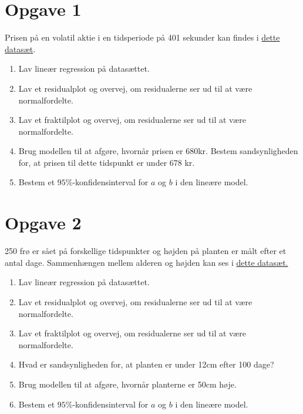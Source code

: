 

\section*{Opgave 1}

Prisen på en volatil aktie i en tidsperiode på 401 sekunder kan findes i \href{https://github.com/ChristianJLex/TeachingNotes/raw/master/2022-2023/Data%20og%20lign/Aktiepris.xlsx}{\color{blue!60} dette datasæt}.
\begin{enumerate}[label=\roman*)]
	\item Lav lineær regression på datasættet.
	\item Lav et residualplot og overvej, om residualerne ser ud til at være normalfordelte.
	\item Lav et fraktilplot og overvej, om residualerne ser ud til at være normalfordelte. 
	\item Brug modellen til at afgøre, hvornår prisen er 680kr. Bestem sandsynligheden for, at prisen til dette tidspunkt er under 678 kr. 
	\item Bestem et $95\%$-konfidensinterval for $a$ og $b$ i den lineære model. 
\end{enumerate}

\section*{Opgave 2}

250 frø er sået på forskellige tidspunkter og højden på planten er målt efter et antal dage. Sammenhængen mellem alderen og højden kan ses i \href{https://github.com/ChristianJLex/TeachingNotes/raw/master/2022-2023/Data%20og%20lign/Plantevaekst.xlsx}{\color{blue!60} dette datasæt.}

\begin{enumerate}[label=\roman*)]
	\item Lav lineær regression på datasættet.
	\item Lav et residualplot og overvej, om residualerne ser ud til at være normalfordelte.
	\item Lav et fraktilplot og overvej, om residualerne ser ud til at være normalfordelte. 
	\item Hvad er sandsynligheden for, at planten er under 12cm efter 100 dage?
	\item Brug modellen til at afgøre, hvornår planterne er 50cm høje.
	\item Bestem et $95\%$-konfidensinterval for $a$ og $b$ i den lineære model. 
\end{enumerate}

